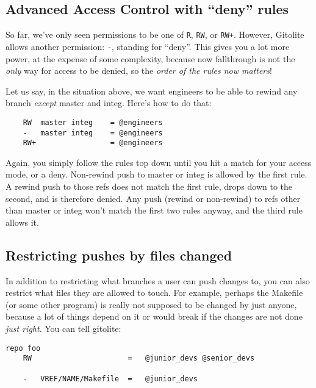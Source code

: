 \documentclass[a4paper]{book}
\begin{document}
\subsection{Advanced Access Control with “deny” rules}

So far, we've only seen permissions to be one of \texttt{R}, \texttt{RW}, or \texttt{RW+}. However, Gitolite allows another permission: \texttt{-}, standing for “deny”. This gives you a lot more power, at the expense of some complexity, because now fallthrough is not the \emph{only} way for access to be denied, so the \emph{order of the rules now matters}!

Let us say, in the situation above, we want engineers to be able to rewind any branch \emph{except} master and integ. Here's how to do that:

\begin{shaded}\begin{verbatim}
    RW  master integ    = @engineers
    -   master integ    = @engineers
    RW+                 = @engineers
\end{verbatim}\end{shaded}

Again, you simply follow the rules top down until you hit a match for your access mode, or a deny. Non-rewind push to master or integ is allowed by the first rule. A rewind push to those refs does not match the first rule, drops down to the second, and is therefore denied. Any push (rewind or non-rewind) to refs other than master or integ won't match the first two rules anyway, and the third rule allows it.

\subsection{Restricting pushes by files changed}

In addition to restricting what branches a user can push changes to, you can also restrict what files they are allowed to touch. For example, perhaps the Makefile (or some other program) is really not supposed to be changed by just anyone, because a lot of things depend on it or would break if the changes are not done \emph{just right}. You can tell gitolite:

\begin{shaded}\begin{verbatim}
repo foo
    RW                      =   @junior_devs @senior_devs

    -   VREF/NAME/Makefile  =   @junior_devs
\end{verbatim}\end{shaded}
\end{document}
